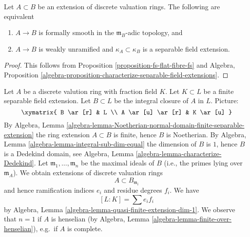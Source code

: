 \begin{lemma}
\label{lemma-extension-dvrs-formally-smooth}
Let $A \subset B$ be an extension of discrete valuation rings.
The following are equivalent
\begin{enumerate}
\item $A \to B$ is formally smooth in the $\mathfrak m_B$-adic topology, and
\item $A \to B$ is weakly unramified and $\kappa_A \subset \kappa_B$
is a separable field extension.
\end{enumerate}
\end{lemma}

\begin{proof}
This follows from Proposition \ref{proposition-fs-flat-fibre-fs} and
Algebra, Proposition
\ref{algebra-proposition-characterize-separable-field-extensions}.
\end{proof}

\begin{remark}
\label{remark-finite-separable-extension}
Let $A$ be a discrete valution ring with fraction field $K$.
Let $K \subset L$ be a finite separable field extension.
Let $B \subset L$ be the integral closure of $A$ in $L$.
Picture:
$$
\xymatrix{
B \ar[r] & L \\
A \ar[u] \ar[r] & K \ar[u]
}
$$
By Algebra, Lemma
\ref{algebra-lemma-Noetherian-normal-domain-finite-separable-extension}
the ring extension $A \subset B$ is finite, hence $B$ is Noetherian.
By Algebra, Lemma \ref{algebra-lemma-integral-sub-dim-equal}
the dimension of $B$ is $1$, hence $B$ is a Dedekind domain, see
Algebra, Lemma \ref{algebra-lemma-characterize-Dedekind}.
Let $\mathfrak m_1, \ldots, \mathfrak m_n$ be the maximal ideals
of $B$ (i.e., the primes lying over $\mathfrak m_A$). We obtain
extensions of discrete valuation rings
$$
A \subset B_{\mathfrak m_i}
$$
and hence ramification indices $e_i$ and residue degrees $f_i$. We have
$$
[L : K] = \sum e_i f_i
$$
by Algebra, Lemma \ref{algebra-lemma-quasi-finite-extension-dim-1}.
We observe that $n = 1$ if $A$ is henselian (by
Algebra, Lemma \ref{algebra-lemma-finite-over-henselian}), e.g.\ if
$A$ is complete.
\end{remark}


